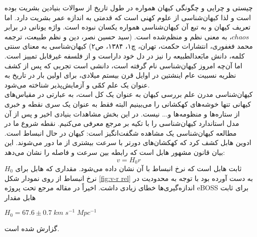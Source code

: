 چیستی و چرایی و چگونگی کیهان همواره در طول تاریخ از سوالات بنیادین بشریت بوده است و لذا کیهان‌شناسی از علوم کهنی است که قدمتی به اندازه عمر بشریت دارد. اما تعریف کیهان و به تبع آن کیهان‌شناسی همواره یکسان نبوده است. واژه یونانی 
 در برابر $chaos$، به معنی نظم و منظم‌شده است. 
 (سید حسین نصر، دین و نظم طبیعت، ترجمه محمد فغفوری، انتشارات حکمت، تهران، چ۱، ۱۳۸۴، ص۲) کیهان‌شناسی به معنای سنتی کلمه، دانش مابَعدالطبیعه را نیز در دل خود داراست و از فلسفه غیرقابل تمییز است. اما آن‌چه امروز کیهان‌شناسی نام گرفته است، دانشی است تجربی که پس از کشف نظریه نسبیت عام اینشتین در اوایل قرن بیستم میلادی، برای اولین بار در تاریخ به عنوان یک علم کمّی و آزمایش‌پذیر شناخته می‌شود. \\ 
 کیهان‌شناسی مدرن علم بررسی کیهان به عنوان یک کل است، به عبارتی در مقیاس‌های کیهانی تنها خوشه‌های کهکشانی را می‌بینیم البته فقط به عنوان یک سری نقطه و خبری از ستاره‌ها و منظومه‌ها و... نیست. در این بخش مشاهدات بنیادی اخیر و پس از آن مدل استاندارد کیهان‌شناسی را با تکیه بر مرجع 
\cite{piattella2018lecture}  
 معرفی می‌کنیم.     
نقطه شروع ما در مطالعه کیهان‌شناسی یک مشاهده شگفت‌انگیز است: کیهان در حال انبساط است. ادوین هابل
کشف کرد که کهکشان‌های دورتر با سرعت بیشتری از ما دور می‌شوند. 
\cite{hubble1929relation}
این بیان قانون مشهور هابل است که رابطه بین سرعت و فاصله را نشان می‌دهد:
\begin{equation}
v = H_0r
\end{equation}
$H_0$
ثابت هابل است که نرخ انبساط با آن نشان داده می‌شود. مقداری که هابل برای نرخ انبساط از روی نمودار شکل
\ref{fig:v-r rel}
به دست آورده بود با توجه به محدودیت در اندازه‌گیری‌ها خطای زیادی داشت. اخیراً در مقاله مرجع  
\cite{gil2016clustering} 
تحت پروژه eBOSS 
برای ثابت هابل مقدار  	
\begin{center}
$H_0 = 67.6 \pm 0.7 \;  km\; s^{-1} \; Mpc^{-1}$
\end{center}
گزارش شده است.


